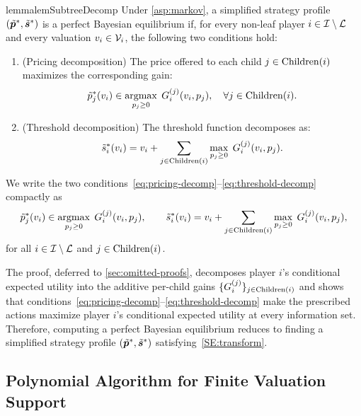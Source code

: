 \begin{restatable}{lemma}{lemSubtreeDecomp}
\label{lem:subtree-decomp}
Under \cref{asp:markov}, a simplified strategy profile $(\tilde{{\bm{p}}}^*, \tilde{{\bm{s}}}^*)$ is a perfect Bayesian equilibrium if, for every non-leaf player $i \in \mathcal{I} \setminus \mathcal{L}$ and every valuation $v_i \in \mathcal{V}_i$, the following two conditions hold:
\begin{enumerate}[left=0em]
\item \textup{(Pricing decomposition)} The price offered to each child $j \in \operatorname{Children}(i)$ maximizes the corresponding gain:
\begin{equation}
\label{eq:pricing-decomp}
\tilde{p}^*_j(v_i) \in \operatorname*{argmax}_{p_j \ge 0}\; G^{(j)}_i(v_i, p_j), \quad \forall j \in \operatorname{Children}(i).
\end{equation}
\item \textup{(Threshold decomposition)} The threshold function decomposes as:
\begin{equation}
\label{eq:threshold-decomp}
\tilde{s}^*_i(v_i) = v_i + \sum_{j \in \operatorname{Children}(i)} \max_{p_j \ge 0}\; G^{(j)}_i(v_i, p_j).
\end{equation}
\end{enumerate}
\end{restatable}

We write the two conditions~\eqref{eq:pricing-decomp}--\eqref{eq:threshold-decomp} compactly as
\begin{equation}
\label{SE:transform}
\tilde{p}^*_j(v_i) \in \operatorname*{argmax}_{p_j \ge 0}\; G^{(j)}_i(v_i, p_j), \qquad \tilde{s}^*_i(v_i) = v_i + \sum_{j \in \operatorname{Children}(i)} \max_{p_j \ge 0}\; G^{(j)}_i(v_i, p_j),
\end{equation}
for all $i \in \mathcal{I} \setminus \mathcal{L}$ and $j \in \operatorname{Children}(i)$.

The proof, deferred to \cref{sec:omitted-proofs}, decomposes player $i$'s conditional expected utility into the additive per-child gains $\{G^{(j)}_i\}_{j \in \operatorname{Children}(i)}$ and shows that conditions~\eqref{eq:pricing-decomp}--\eqref{eq:threshold-decomp} make the prescribed actions maximize player $i$'s conditional expected utility at every information set.
Therefore, computing a perfect Bayesian equilibrium reduces to finding a simplified strategy profile $(\tilde{{\bm{p}}}^*, \tilde{{\bm{s}}}^*)$ satisfying~\eqref{SE:transform}.


\subsection{Polynomial Algorithm for Finite Valuation Support}
\label{subsec:exact-finite}

